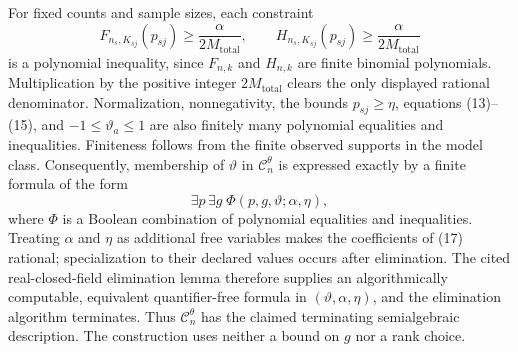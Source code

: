 For fixed counts and sample sizes, each constraint
\[
F_{n_s,K_{sj}}(p_{sj})\geq\frac{\alpha}{2M_{\mathrm{total}}},
\qquad
H_{n_s,K_{sj}}(p_{sj})\geq\frac{\alpha}{2M_{\mathrm{total}}}
\tag{16}
\]
is a polynomial inequality, since \(F_{n,k}\) and \(H_{n,k}\) are finite binomial polynomials.  Multiplication by the positive integer \(2M_{\mathrm{total}}\) clears the only displayed rational denominator.  Normalization, nonnegativity, the bounds \(p_{sj}\geq\eta\), equations (13)--(15), and \(-1\leq\vartheta_a\leq1\) are also finitely many polynomial equalities and inequalities.  Finiteness follows from the finite observed supports in the model class.  Consequently, membership of \(\vartheta\) in \(\mathcal C_n^\theta\) is expressed exactly by a finite formula of the form
\[
\exists p\,\exists g\;\Phi(p,g,\vartheta;\alpha,\eta),
\tag{17}
\]
where \(\Phi\) is a Boolean combination of polynomial equalities and inequalities.  Treating \(\alpha\) and \(\eta\) as additional free variables makes the coefficients of (17) rational; specialization to their declared values occurs after elimination.  The cited real-closed-field elimination lemma therefore supplies an algorithmically computable, equivalent quantifier-free formula in \((\vartheta,\alpha,\eta)\), and the elimination algorithm terminates.  Thus \(\mathcal C_n^\theta\) has the claimed terminating semialgebraic description.  The construction uses neither a bound on \(g\) nor a rank choice.

